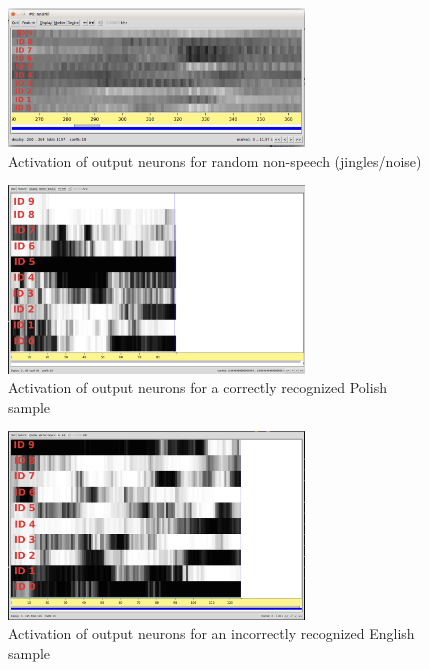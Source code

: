 \begin{figure}[h!]
\caption{Activation of output neurons for random non-speech (jingles/noise)}
\label{fig:noise}
\centering
\includegraphics[width=0.7\textwidth]{images/noise.png}
\end{figure}

\begin{figure}[h!]
\caption{Activation of output neurons for a correctly recognized Polish sample}
\label{fig:polish}
\centering
\includegraphics[width=0.7\textwidth]{images/polishCorrect.png}
\end{figure}

\begin{figure}[h!!]
\caption{Activation of output neurons for an incorrectly recognized English sample}
\label{fig:incorrect}
\centering
\includegraphics[width=0.7\textwidth]{images/incorrect.png}
\end{figure}
\newpage

